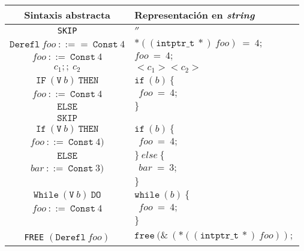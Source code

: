 \begin{table}[h!]
\centering
\begin{tabular}{|c|l|}
  \hline
  \textbf{Sintaxis abstracta} & \textbf{Representación en \textit{string}} \\ [0.5ex]
  \hline \hline
  \verb|SKIP| & $''$ \\
  \hline
  $\mathtt{Derefl}\ foo\ ::==\ \mathtt{Const}\ 4$                            & $*((\mathtt{intptr\_t}\ *)\ foo)\ =\ 4;$ \\
  \hline
  $foo\ ::=\ \mathtt{Const}\ 4$                                              & $foo\ =\ 4;$ \\
  \hline
  $c_1;;\ c_2$                                                               & $<c_1> <c_2>$ \\
  \hline
  $\mathtt{IF}\ (\mathtt{V}\ b)\ \mathtt{THEN}$                              & $\mathtt{if}\ (b)\ \{$\\
  $foo\ ::=\ \mathtt{Const}\ 4$                                              & $\ \ foo\ =\ 4;$ \\
  $\mathtt{ELSE}$                                                            &  $\}$ \\
  $\mathtt{SKIP}$                                                            & \\
  \hline
  $\mathtt{If}\ (\mathtt{V}\ b)\ \mathtt{THEN}$                              & $\mathtt{if}\ (b)\ \{$\\
  $foo\ ::=\ \mathtt{Const}\ 4)$                                             & $\ \ foo\ =\ 4;$ \\
  $\mathtt{ELSE}$                                                            & $\}\ else\ \{$ \\
  $bar\ ::=\ \mathtt{Const}\ 3)$                                             & $\ \ bar\ =\ 3;$ \\
                                                                             & $\}$ \\
  \hline
  $\mathtt{While}\ (\mathtt{V}\ b)\ \mathtt{DO}$                             & $\mathtt{while}\ (b)\ \{$\\
  $foo\ ::=\ \mathtt{Const}\ 4$                                              & $\ \ foo\ =\ 4;$ \\
                                                                             & $\}$ \\
  \hline
  \verb|FREE| $(\mathtt{Derefl}\ foo)$                                       & $\mathtt{free}\ (\&\ (*((\mathtt{intptr\_t}\ *)\ foo));$ \\

\end{tabular}
\end{table}
